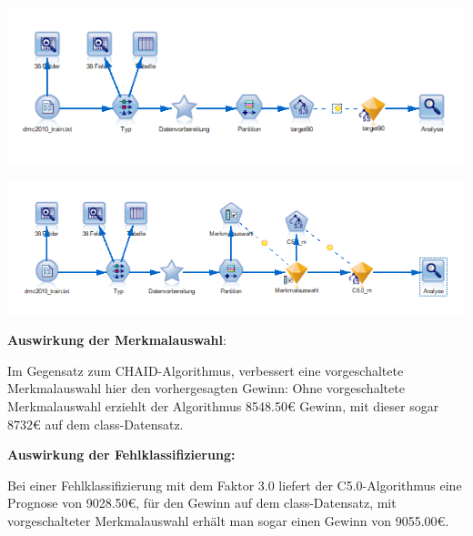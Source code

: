 \documentclass[a4paper,12pt]{article}
\newcounter{Algorithmus}
\begin{document}
\begin{center}
\includegraphics[width=\textwidth]{Screens/c50}
\end{center}

\begin{center}
\includegraphics[width=\textwidth]{Screens/c50_m}
\end{center}

{\bf Auswirkung der Merkmalauswahl}:
\par
Im Gegensatz zum CHAID-Algorithmus, verbessert eine vorgeschaltete Merkmalauswahl hier den vorhergesagten Gewinn: Ohne vorgeschaltete Merkmalauswahl erziehlt der Algorithmus 8548.50\;\euro\; Gewinn, mit dieser sogar 8732\;\euro\; auf dem class-Datensatz.
\par
\vspace{0.2cm}

{\bf Auswirkung der Fehlklassifizierung:}
\par
 Bei einer Fehlklassifizierung mit dem Faktor 3.0 liefert der C5.0-Algorithmus eine Prognose von 9028.50\;\euro,\; für den Gewinn auf dem class-Datensatz, mit vorgeschalteter Merkmalauswahl erhält man sogar einen Gewinn von 9055.00\;\euro\;.
\end{document}
